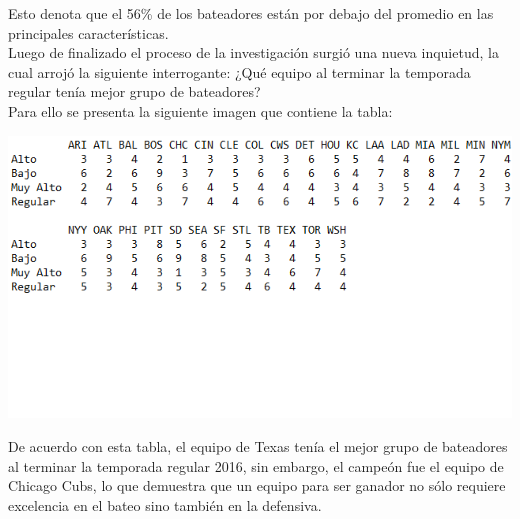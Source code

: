 \documentclass[11pt,letterpaper]{report}
\begin{document}
     
     Esto denota que el 56\% de los bateadores están por debajo del promedio en las principales características.\\
     
     Luego de finalizado el proceso de la investigación surgió una nueva inquietud, la cual arrojó la siguiente interrogante: ¿Qué equipo al terminar la temporada regular tenía mejor grupo de bateadores? \\ 
     
     Para ello se presenta la siguiente imagen que contiene la tabla:
  
  \begin{center}
  		\includegraphics[scale=0.65]{equi.png}
  \end{center}
     
     De acuerdo con esta tabla, el equipo de Texas tenía el mejor grupo de bateadores al terminar la temporada regular 2016, sin embargo, el campeón fue el equipo de Chicago Cubs, lo que demuestra que un equipo para ser ganador no sólo requiere excelencia en el bateo sino también en la defensiva.
     
   
  
\end{document}
